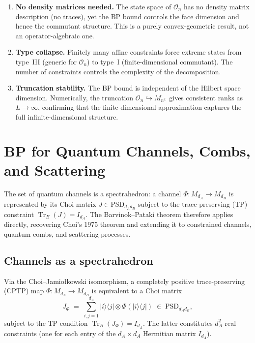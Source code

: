 \documentclass[11pt,a4paper]{article}
\theoremstyle{definition}
\newcommand{\PSD}{\mathrm{PSD}}
\newcommand{\Tr}{\operatorname{Tr}}
\newcommand{\ket}[1]{|#1\rangle}
\newcommand{\bra}[1]{\langle#1|}
\begin{document}
\begin{enumerate}
\item \textbf{No density matrices needed.}  The state space of
  $\mathcal{O}_n$ has no density matrix description (no traces),
  yet the BP bound controls the face dimension and hence the
  commutant structure.  This is a purely convex-geometric result,
  not an operator-algebraic one.

\item \textbf{Type collapse.}  Finitely many affine constraints
  force extreme states from type~III (generic for $\mathcal{O}_n$)
  to type~I (finite-dimensional commutant).  The number of
  constraints controls the complexity of the decomposition.

\item \textbf{Truncation stability.}  The BP bound is independent
  of the Hilbert space dimension.  Numerically, the truncation
  $\mathcal{O}_n \hookrightarrow M_{n^L}$ gives consistent ranks
  as $L \to \infty$, confirming that the finite-dimensional
  approximation captures the full infinite-dimensional structure.
\end{enumerate}

\section{BP for Quantum Channels, Combs, and Scattering}
\label{sec:channels}

The set of quantum channels is a spectrahedron: a channel
$\Phi \colon M_{d_A} \to M_{d_B}$ is represented by its Choi matrix
$J \in \PSD_{d_A d_B}$ subject to the trace-preserving (TP) constraint
$\Tr_B(J) = I_{d_A}$.  The Barvinok--Pataki theorem therefore applies
directly, recovering Choi's 1975 theorem \cite{choi75} and extending
it to constrained channels, quantum combs, and scattering processes.

\subsection{Channels as a spectrahedron}
\label{sec:channels-spectrahedron}

Via the Choi--Jamio\l{}kowski isomorphism, a completely positive
trace-preserving (CPTP) map $\Phi \colon M_{d_A} \to M_{d_B}$ is
equivalent to a Choi matrix
\[
  J_\Phi \;=\; \sum_{i,j=1}^{d_A} \ket{i}\!\bra{j} \otimes
  \Phi(\ket{i}\!\bra{j})
  \;\in\; \PSD_{d_A d_B},
\]
subject to the TP condition $\Tr_B(J_\Phi) = I_{d_A}$.  The latter
constitutes $d_A^2$ real constraints (one for each entry of the
$d_A \times d_A$ Hermitian matrix $I_{d_A}$).
\end{document}
